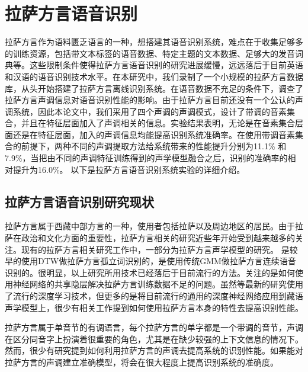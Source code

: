 
\chapter{拉萨方言语音识别}
拉萨方言作为语料匮乏语言的一种，想搭建其语音识别系统，难点在于收集足够多的训练资源，包括带文本标签的语音数据、特定主题的文本数据、足够大的发音词典等。这些限制条件使得拉萨方言语音识别的研究进展缓慢，远远落后于目前英语和汉语的语音识别技术水平。在本研究中，我们录制了一个小规模的拉萨方言数据库，从头开始搭建了拉萨方言离线识别系统。在语音数据不充足的条件下，调查了拉萨方言声调信息对语音识别性能的影响。由于拉萨方言目前还没有一个公认的声调系统，因此本论文中，我们采用了四个声调的声调模式，设计了带调的音素集合，并且在特征层面加入了声调相关的信息。实验结果表明，无论是在音素集合层面还是在特征层面，加入的声调信息均能提高识别系统准确率。在使用带调音素集合的前提下，两种不同的声调提取方法给系统带来的性能提升分别为11.1\% 和7.9\%，当把由不同的声调特征训练得到的声学模型融合之后，识别的准确率的相对提升为16.0\%。 以下是拉萨方言语音识别系统实验的详细介绍。
\section{拉萨方言语音识别研究现状}
拉萨方言属于西藏中部方言的一种，使用者包括拉萨以及周边地区的居民。由于拉萨在政治和文化方面的重要性，拉萨方言相关的研究近些年开始受到越来越多的关注。现有的拉萨方言相关研究工作中，一部分为拉萨方言声学模型的研究。\cite{yao2009research} 是较早的使用DTW做拉萨方言孤立词识别的，\cite{li2012research}\cite{li2014large}是使用传统GMM做拉萨方言连续语音识别的。很明显，以上研究所用技术已经落后于目前流行的方法。\cite{wang2014cross}\cite{zhao2015shared}关注的是如何使用神经网络的共享隐层解决拉萨方言训练数据不足的问题。虽然\cite{wang2014cross}\cite{zhao2015shared}等最新的研究使用了流行的深度学习技术，但更多的是将目前流行的通用的深度神经网络应用到藏语声学模型上，很少有相关工作提到如何使用拉萨方言本身的特性去提高识别性能。

拉萨方言属于单音节的有调语言，每个拉萨方言的单字都是一个带调的音节，声调在区分同音字上扮演着很重要的角色，尤其是在缺少较强的上下文信息的情况下。然而，很少有研究提到如何利用拉萨方言的声调去提高系统的识别性能。如果能对拉萨方言的声调建立准确模型，将会在很大程度上提高识别系统的准确度。
